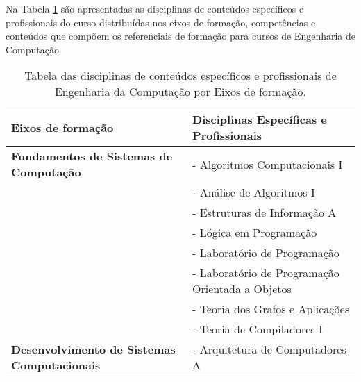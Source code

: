 Na Tabela \ref{tab:areas} são apresentadas as disciplinas de conteúdos específicos e profissionais do curso distribuídas nos eixos de formação, competências e conteúdos que compõem os referenciais de formação para cursos de Engenharia de Computação.




\begin{table}[ht]

    \centering

    \caption{Tabela das disciplinas de conteúdos específicos e profissionais de Engenharia da Computação por Eixos de formação.}

    \label{tab:areas}

    \begin{tabular}{l l}

        \hline

        {\bf Eixos de formação} & {\bf Disciplinas Específicas e Profissionais}          \\

        \hline

        \textbf{Fundamentos de Sistemas de Computação}
                                & - Algoritmos Computacionais I                          \\

                                & - Análise de Algoritmos I                              \\

                                & - Estruturas de Informação A                           \\

                                & - Lógica em Programação                                \\

                                & - Laboratório de Programação                           \\

                                & - Laboratório de Programação Orientada a Objetos       \\

                                & - Teoria dos Grafos e Aplicações                       \\

                                & - Teoria de Compiladores I                             \\ \hline

        \textbf{Desenvolvimento de Sistemas Computacionais}
                                & - Arquitetura de Computadores A                        \\


\end{tabular}
\end{table}
